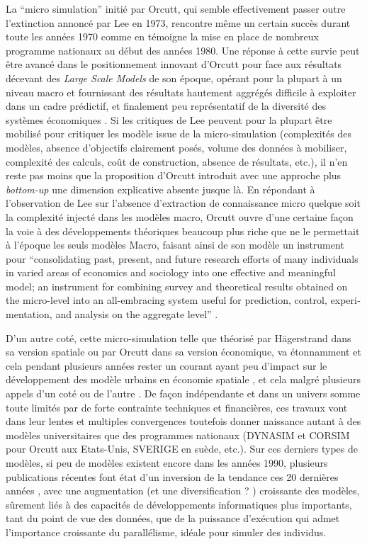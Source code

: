 {%
La \enquote{micro simulation} initié par Orcutt, qui semble effectivement passer outre l'extinction annoncé par Lee en 1973, rencontre même un certain succès durant toute les années 1970 comme en témoigne la mise en place de nombreux programme nationaux au début des années 1980. \autocite{Baroni2007} Une réponse à cette survie peut être avancé dans le positionnement innovant d'Orcutt pour face aux résultats décevant des \textit{Large Scale Models} de son époque, opérant pour la plupart à un niveau macro et fournissant des résultats hautement aggrégés difficile à exploiter dans un cadre prédictif, et finalement peu représentatif de la diversité des systèmes économiques \autocite{Birkin2012} \autocite{Baroni2007}. Si les critiques de Lee peuvent pour la plupart être mobilisé pour critiquer les modèle issue de la micro-simulation (complexités des modèles, absence d'objectifs clairement posés, volume des données à mobiliser, complexité des calculs, coût de construction, absence de résultats, etc.), il n'en reste pas moins que la proposition d'Orcutt introduit avec une approche plus \textit{bottom-up} une dimension explicative absente jusque là. En répondant à l'observation de Lee sur l'absence d'extraction de connaissance micro quelque soit la complexité injecté dans les modèles macro, Orcutt ouvre d'une certaine façon la voie à des développements théoriques beaucoup plus riche que ne le permettait à l'époque les seuls modèles Macro, faisant ainsi de son modèle un instrument pour \foreignquote{english}{consolidating past, present, and future research efforts of many individuals in varied areas of economics and sociology into one effective and meaningful model; an instrument for combining survey and theoretical results obtained on the micro-level into an all-embracing system useful for prediction, control, experimentation, and analysis on the aggregate level} \autocite[122]{Cohen1961}.

D'un autre coté, cette micro-simulation telle que théorisé par Hägerstrand dans sa version spatiale ou par Orcutt dans sa version économique, va étonnamment et cela pendant plusieurs années rester un courant ayant peu d'impact sur le développement des modèle urbains en économie spatiale \autocite[5]{Sanders2006}, et cela malgré plusieurs appels d'un coté \autocite{Hagerstrand1970} ou de l'autre \autocite[5]{Isard1998}. De façon indépendante et dans un univers somme toute limités par de forte contrainte techniques et financières, ces travaux vont dans leur lentes et multiples convergences toutefois donner naissance autant à des modèles universitaires que des programmes nationaux (DYNASIM et CORSIM pour Orcutt aux Etats-Unis, SVERIGE en suède, etc.). Sur ces derniers types de modèles, si peu de modèles existent encore dans les années 1990, plusieurs publications récentes font état d'un inversion de la tendance ces 20 dernières années \autocite{Lenormand2013}, avec une augmentation (et une diversification ? ) croissante des modèles, sûrement liés à des capacités de développements informatiques plus importants, tant du point de vue des données, que de la puissance d’exécution qui admet l'importance croissante du parallélisme, idéale pour simuler des individus. \autocite[5]{Sanders2006} \autocite{Lenormand2013}

}
